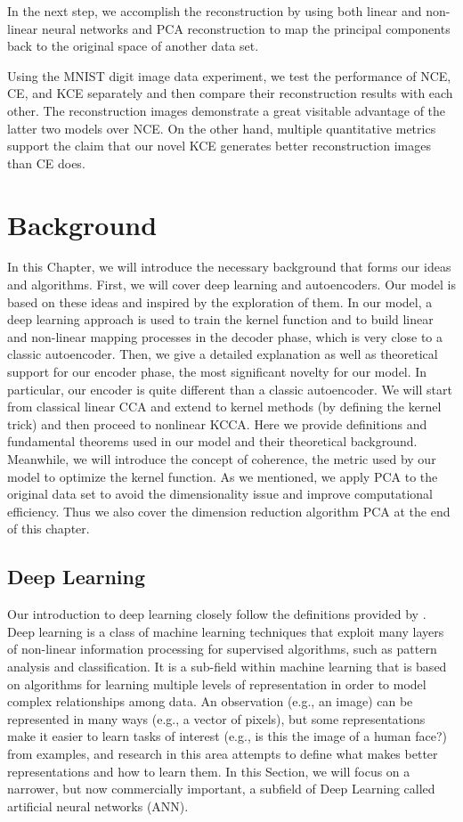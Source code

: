 \documentclass[12pt]{report} %
\begin{document}
In the next step, we accomplish the reconstruction by using both linear and non-linear neural networks and PCA reconstruction to map the principal components back to the original space of another data set. 

Using the MNIST digit image data experiment, we test the performance of NCE, CE, and KCE separately and then compare their reconstruction results with each other. The reconstruction images demonstrate a great visitable advantage of the latter two models over NCE. On the other hand, multiple quantitative metrics support the claim that our novel KCE generates better reconstruction images than CE does. 

\chapter{Background}
In this Chapter, we will introduce the necessary background that forms our ideas and algorithms. First, we will cover deep learning and autoencoders. Our model is based on these ideas and inspired by the exploration of them. In our model, a deep learning approach is used to train the kernel function and to build linear and non-linear mapping processes in the decoder phase, which is very close to a classic autoencoder. 
Then, we give a detailed explanation as well as theoretical support for our encoder phase, the most significant novelty for our model. In particular, our encoder is quite different than a classic autoencoder. We will start from classical linear CCA and extend to kernel methods (by defining the kernel trick) and then proceed to nonlinear KCCA. Here we provide definitions and fundamental theorems used in our model and their theoretical background. Meanwhile, we will introduce the concept of coherence, the metric used by our model to optimize the kernel function. 
As we mentioned, we apply PCA to the original data set to avoid the dimensionality issue and improve computational efficiency. Thus we also cover the dimension reduction algorithm PCA at the end of this chapter. 

\section{Deep Learning}
Our introduction to deep learning closely follow the definitions provided by \cite{DL}. Deep learning is a class of machine learning techniques that exploit many layers of non-linear information processing for supervised algorithms, such as pattern analysis and classification. It is a sub-field within machine learning that is based on algorithms for learning multiple levels of representation in order to model complex relationships among data. An observation (e.g., an image) can be represented in many ways (e.g., a vector of pixels), but some representations make it easier to learn tasks of interest (e.g.,
is this the image of a human face?) from examples, and research in this area attempts to define what makes better representations and how to learn them\cite{DL}. In this Section, we will focus on a narrower, but now commercially important, a subfield of Deep Learning called artificial neural networks (ANN).
\end{document}
